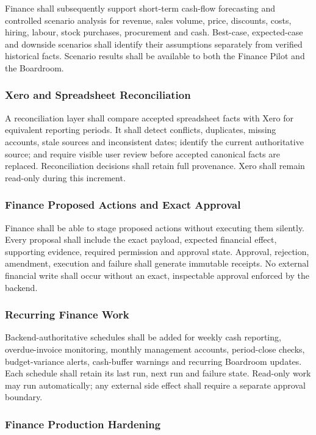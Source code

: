 Finance shall subsequently support short-term cash-flow forecasting and controlled scenario
analysis for revenue, sales volume, price, discounts, costs, hiring, labour, stock purchases,
procurement and cash.  Best-case, expected-case and downside scenarios shall identify their
assumptions separately from verified historical facts.  Scenario results shall be available
to both the Finance Pilot and the Boardroom.

\subsubsection{Xero and Spreadsheet Reconciliation}

A reconciliation layer shall compare accepted spreadsheet facts with Xero for equivalent
reporting periods.  It shall detect conflicts, duplicates, missing accounts, stale sources
and inconsistent dates; identify the current authoritative source; and require visible user
review before accepted canonical facts are replaced.  Reconciliation decisions shall retain
full provenance.  Xero shall remain read-only during this increment.

\subsubsection{Finance Proposed Actions and Exact Approval}

Finance shall be able to stage proposed actions without executing them silently.  Every
proposal shall include the exact payload, expected financial effect, supporting evidence,
required permission and approval state.  Approval, rejection, amendment, execution and
failure shall generate immutable receipts.  No external financial write shall occur without
an exact, inspectable approval enforced by the backend.

\subsubsection{Recurring Finance Work}

Backend-authoritative schedules shall be added for weekly cash reporting, overdue-invoice
monitoring, monthly management accounts, period-close checks, budget-variance alerts,
cash-buffer warnings and recurring Boardroom updates.  Each schedule shall retain its last
run, next run and failure state.  Read-only work may run automatically; any external side
effect shall require a separate approval boundary.

\subsubsection{Finance Production Hardening}

